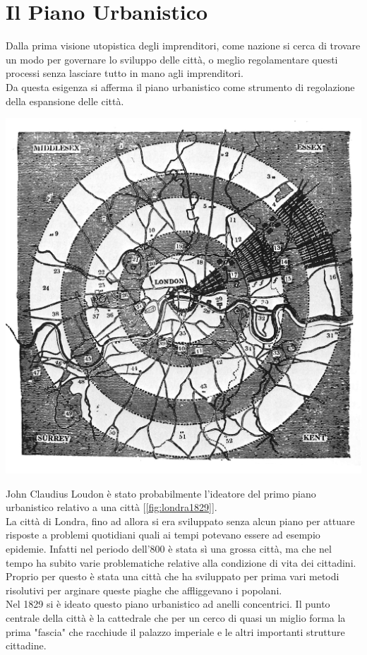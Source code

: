 \documentclass[a4paper,12pt, oneside]{book}
\begin{document}
    \section{Il Piano Urbanistico}
    Dalla prima visione utopistica degli imprenditori, come nazione si cerca di trovare un modo per governare lo sviluppo delle città, o meglio regolamentare questi processi senza lasciare tutto in mano agli imprenditori.\\
    Da questa esigenza si afferma il piano urbanistico come strumento di regolazione della espansione delle città.\\
    \begin{center}
    	\includegraphics[width=0.6\linewidth]{"immagini/london 1829"}
    	\label{fig:londra1829}
    \end{center}
    John Claudius Loudon è stato probabilmente l'ideatore del primo piano urbanistico relativo a una città [\ref{fig:londra1829}].\\
    La città di Londra, fino ad allora si era sviluppato senza alcun piano per attuare risposte a problemi quotidiani quali ai tempi potevano essere ad esempio epidemie. Infatti nel periodo dell'800 è stata sì una grossa città, ma che nel tempo ha subito varie problematiche relative alla condizione di vita dei cittadini.\\
    Proprio per questo è stata una città che ha sviluppato per prima vari metodi risolutivi per arginare queste piaghe che affliggevano i popolani.\\
    Nel 1829 si è ideato questo piano urbanistico ad anelli concentrici. Il punto centrale della città è la cattedrale che per un cerco di quasi un miglio forma la prima "fascia" che racchiude il palazzo imperiale e le altri importanti strutture cittadine.\\
\end{document}
